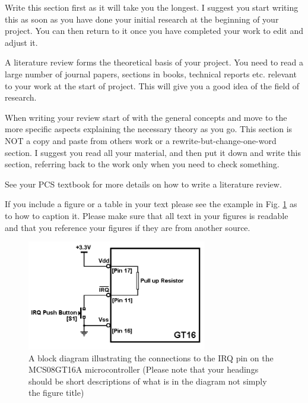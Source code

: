 Write this section first as it will take you the longest. I suggest you start writing this as soon as you
have done your initial research at the beginning of your project. You can then return to it once you
have completed your work to edit and adjust it.

A literature review forms the theoretical basis of your project. You need to read a large number of
journal papers, sections in books, technical reports etc. relevant to your work at the start of project.
This will give you a good idea of the field of research.

When writing your review start of with the general concepts and move to the more specific aspects
explaining the necessary theory as you go. This section is NOT a copy and paste from others work or a
rewrite-but-change-one-word section. I suggest you read all your material, and then put it down and
write this section, referring back to the work only when you need to check something.

See your PCS textbook for more details on how to write a literature review.

If you include a figure or a table in your text please see the example in Fig. \ref{fig:model} as to how to caption it.
Please make sure that all text in your figures is readable and that you reference your figures if they are
from another source.

\begin{figure}[ht]
\centering
\includegraphics[width=0.7\textwidth]{model.png}
\caption{A block diagram illustrating the connections to the IRQ pin on the MCS08GT16A microcontroller (Please
note that your headings should be short descriptions of what is in the diagram not simply the figure title)}
\label{fig:model}
\end{figure}

